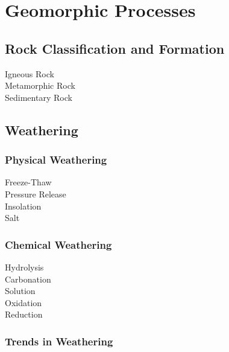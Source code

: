 \documentclass[../../main]{subfiles}
\begin{document}
\section{Geomorphic Processes}

\subsection{Rock Classification and Formation}

	\begin{description}
		\item[Igneous Rock]
		\item[Metamorphic Rock]
		\item[Sedimentary Rock]
	\end{description}

\subsection{Weathering}

	\subsubsection{Physical Weathering}

	\begin{description}
		\item[Freeze-Thaw]
		\item[Pressure Release]
		\item[Insolation]
		\item[Salt]
	\end{description}

	\subsubsection{Chemical Weathering}

	\begin{description}
		\item[Hydrolysis]
		\item[Carbonation]
		\item[Solution]
		\item[Oxidation]
		\item[Reduction]
	\end{description}

	\subsubsection{Trends in Weathering}
\end{document}
